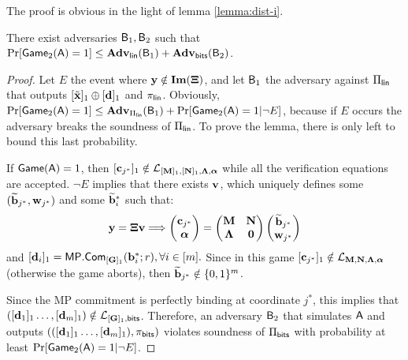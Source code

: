 The proof is obvious in the light of lemma \ref{lemma:dist-i}. 
%

\begin{lemma}
There exist adversaries $\mathsf{B}_1,\mathsf{B}_2$ such that $\Pr[\mathsf{Game}_2(\mathsf{A})=1]\leq\mathbf{Adv}_{\mathsf{lin}}(\mathsf{B}_1)+\mathbf{Adv}_{\mathsf{bits}}(\mathsf{B}_2)$.
\end{lemma}

\begin{proof}
Let $E$ the event where $\mathbf{y}\notin\mathbf{Im}(\mathbf{{\Xi}})$, and let $\mathsf{B}_1$ the adversary against $\Pi_{\mathsf{lin}}$ that outputs $[{\tilde{\mathbf{x}}}]_1\oplus[\mathbf{d}]_1$ and $\pi_{\mathsf{lin}}$. Obviously, $\Pr[\mathsf{Game}_2(\mathsf{A})=1]\leq\mathbf{Adv}_{\Pi_{\mathsf{lin}}}(\mathsf{B}_1)+\Pr[\mathsf{Game}_2(\mathsf{A})=1|\neg E]$, because 
if $E$ occurs the adversary breaks the soundness of
 $\Pi_{\mathsf{lin}}$. To prove the lemma, there is only left to bound this last probability.

If $\mathsf{Game}(\mathsf{A})=1$, then $[\mathbf{c}_{j^*}]_1\notin \mathcal{L}_{[\mathbf{{M}}]_1,[\mathbf{{N}}]_1,\mathbf{{\Lambda}},{\boldsymbol \alpha}}$ while all the verification equations are accepted. $\neg E$ implies that there exists $\mathbf{v}$, 
which uniquely defines some $(\widetilde{\mathbf{b}}_{j^*},\mathbf{w}_{j^*})$ and some $\widetilde{\mathbf{b}}_i^*$ such that:
$$
\mathbf{y}=\mathbf{{\Xi}} \mathbf{v}
\Longrightarrow
\left(\begin{matrix}\mathbf{c}_{j^*}\\ {\boldsymbol \alpha}\end{matrix}\right)=
\begin{pmatrix}
    \mathbf{{M}}       & \mathbf{{N}}\\
    \mathbf{{\Lambda}} & \mathbf{{0}}
\end{pmatrix}
\left(\begin{matrix}
    \widetilde{\mathbf{b}}_{j^*}\\
    \mathbf{w}_{j^*}
\end{matrix}\right)
$$
 and $[\mathbf{{d}}_i]_1=\mathsf{MP}.\mathsf{Com}_{[\mathbf{{G}}]_1}(\mathbf{b}_i^*;r), \forall i\in[{m}].$
Since in this game $[\mathbf{c}_{j^*}]_1 \notin \mathcal{L}_{\mathbf{{M}},\mathbf{{N}},\mathbf{{\Lambda}},{\boldsymbol \alpha}}$ (otherwise the game aborts), then $\widetilde{\mathbf{b}}_{j^*}\notin\{0,1\}^{m}$. 

Since the MP commitment is perfectly binding at coordinate 
$j^*$, this implies that  $([\mathbf{d}_1]_1\ldots,[\mathbf{d}_{m}]_1)\notin \mathcal{L}_{[\mathbf{{G}}]_1,\mathsf{bits}}$. 
Therefore, an adversary $\mathsf{B}_2$ that simulates $\mathsf{A}$ and outputs $(([\mathbf{d}_1]_1\ldots,[\mathbf{d}_{m}]_1),\pi_{\mathsf{bits}})$ violates soundness of $\Pi_{\mathsf{bits}}$ with probability at least $\Pr[\mathsf{Game}_2(\mathsf{A})=1|\neg E]$.
\end{proof}

